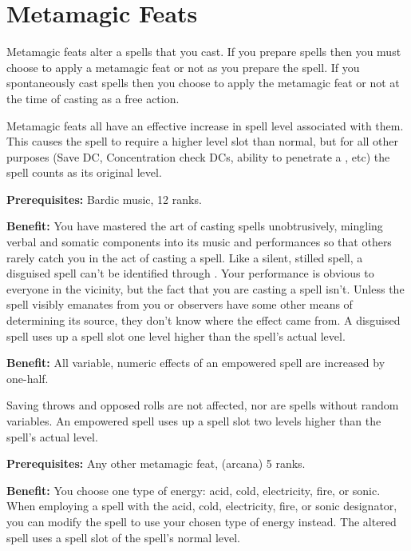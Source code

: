 \section{Metamagic Feats}

Metamagic feats alter a spells that you cast. If you prepare spells then you must choose to apply a metamagic feat or not as you prepare the spell. If you spontaneously cast spells then you choose to apply the metamagic feat or not at the time of casting as a free action.

Metamagic feats all have an effective increase in spell level associated with them. This causes the spell to require a higher level slot than normal, but for all other purposes (Save DC, Concentration check DCs, ability to penetrate a , etc) the spell counts as its original level.


\textbf{Prerequisites:} Bardic music,  12 ranks.

\textbf{Benefit:} You have mastered the art of casting spells unobtrusively, mingling verbal and somatic components into its music and performances so that others rarely catch you in the act of casting a spell. Like a silent, stilled spell, a disguised spell can't be identified through . Your performance is obvious to everyone in the vicinity, but the fact that you are casting a spell isn't. Unless the spell visibly emanates from you or observers have some other means of determining its source, they don't know where the effect came from. A disguised spell uses up a spell slot one level higher than the spell's actual level.


\textbf{Benefit:} All variable, numeric effects of an empowered spell are increased 
by one-half.

Saving throws and opposed rolls are not affected, nor are spells without random variables. An empowered spell uses up a spell slot two levels higher than the spell's actual level.


\textbf{Prerequisites:} Any other metamagic feat,  (arcana) 5 ranks.

\textbf{Benefit:} You choose one type of energy: acid, cold, electricity, fire, or sonic. When employing a spell with the acid, cold, electricity, fire, or sonic designator, you can modify the spell to use your chosen type of energy instead. The altered spell uses a spell slot of the spell's normal level.

